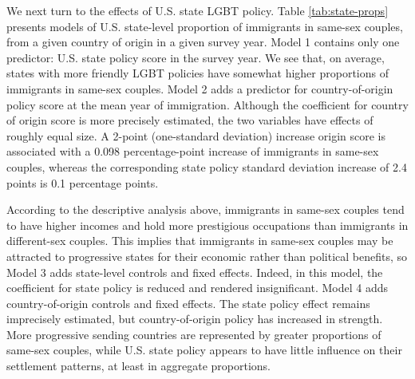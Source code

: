 \documentclass[
  11pt,
]{article}
\begin{document}
We next turn to the effects of U.S. state LGBT policy. Table \ref{tab:state-props} presents models of U.S. state-level proportion of immigrants in same-sex couples, from a given country of origin in a given survey year. Model 1 contains only one predictor: U.S. state policy score in the survey year. We see that, on average, states with more friendly LGBT policies have somewhat higher proportions of immigrants in same-sex couples. Model 2 adds a predictor for country-of-origin policy score at the mean year of immigration. Although the coefficient for country of origin score is more precisely estimated, the two variables have effects of roughly equal size. A 2-point (one-standard deviation) increase origin score is associated with a 0.098 percentage-point increase of immigrants in same-sex couples, whereas the corresponding state policy standard deviation increase of 2.4 points is 0.1 percentage points.

According to the descriptive analysis above, immigrants in same-sex couples tend to have higher incomes and hold more prestigious occupations than immigrants in different-sex couples. This implies that immigrants in same-sex couples may be attracted to progressive states for their economic rather than political benefits, so Model 3 adds state-level controls and fixed effects. Indeed, in this model, the coefficient for state policy is reduced and rendered insignificant. Model 4 adds country-of-origin controls and fixed effects. The state policy effect remains imprecisely estimated, but country-of-origin policy has increased in strength. More progressive sending countries are represented by greater proportions of same-sex couples, while U.S. state policy appears to have little influence on their settlement patterns, at least in aggregate proportions.
\end{document}
